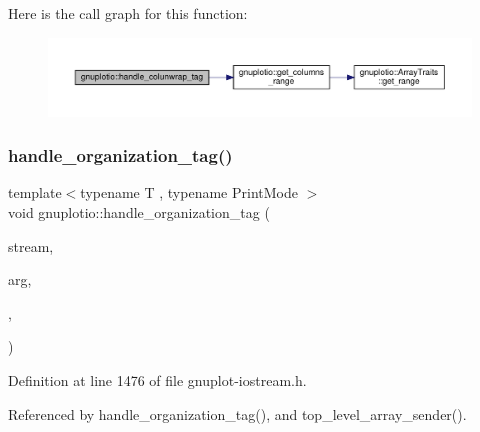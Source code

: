 Here is the call graph for this function\+:\nopagebreak
\begin{figure}[H]
\begin{center}
\leavevmode
\includegraphics[width=350pt]{namespacegnuplotio_a3b8981d3f39de8a058b5f18484f06c3c_cgraph}
\end{center}
\end{figure}
\mbox{\label{namespacegnuplotio_af809657552a53c3b17f0400a5c210a7f}} 
\subsubsection{\texorpdfstring{handle\+\_\+organization\+\_\+tag()}{handle\_organization\_tag()}\hspace{0.1cm}{\footnotesize\ttfamily [1/5]}}
{\footnotesize\ttfamily template$<$typename T , typename Print\+Mode $>$ \\
void gnuplotio\+::handle\+\_\+organization\+\_\+tag (\begin{DoxyParamCaption}\item[{std\+::ostream \&}]{stream,  }\item[{const T \&}]{arg,  }\item[{\hyperlink{structgnuplotio_1_1_mode1_d}{Mode1D}}]{,  }\item[{Print\+Mode}]{ }\end{DoxyParamCaption})}



Definition at line 1476 of file gnuplot-\/iostream.\+h.



Referenced by handle\+\_\+organization\+\_\+tag(), and top\+\_\+level\+\_\+array\+\_\+sender().

\mbox{\label{namespacegnuplotio_a1310221abf0551a805d4482f0612317b}} 
